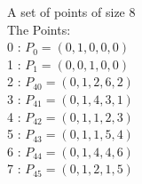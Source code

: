 A set of points of size 8\\
The Points:\\
0 : $P_{0} = ( 0, 1, 0, 0, 0 )$\\
1 : $P_{1} = ( 0, 0, 1, 0, 0 )$\\
2 : $P_{40} = ( 0, 1, 2, 6, 2 )$\\
3 : $P_{41} = ( 0, 1, 4, 3, 1 )$\\
4 : $P_{42} = ( 0, 1, 1, 2, 3 )$\\
5 : $P_{43} = ( 0, 1, 1, 5, 4 )$\\
6 : $P_{44} = ( 0, 1, 4, 4, 6 )$\\
7 : $P_{45} = ( 0, 1, 2, 1, 5 )$\\
